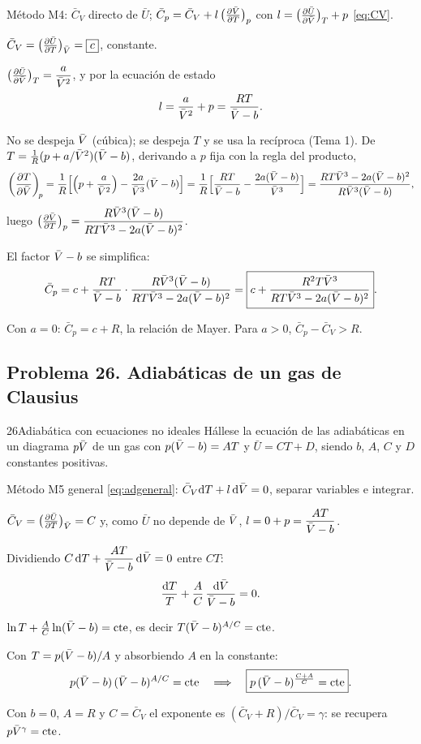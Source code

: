 \begin{resolucion}
\idea Método M4: $\bar C_V$ directo de $\bar U$; $\bar C_p=\bar C_V+l\,\bigl(\tfrac{\partial \bar{V}}{\partial T}\bigr)_{p}$ con
$l=\bigl(\tfrac{\partial \bar U}{\partial \bar{V}}\bigr)_{T}+p$ \eqref{eq:CV}.

 $\bar C_V=\bigl(\tfrac{\partial \bar U}{\partial T}\bigr)_{\bar{V}}=\boxed{c}$, constante.

 $\bigl(\tfrac{\partial \bar U}{\partial \bar{V}}\bigr)_{T}=\dfrac{a}{\bar{V}^2}$, y por la ecuación de estado
\[
  l=\frac{a}{\bar{V}^2}+p=\frac{RT}{\bar{V}-b}.
\]

 No se despeja $\bar{V}$ (cúbica); se despeja $T$ y se usa la recíproca
(Tema 1). De $T=\frac1R(p+a/\bar{V}^2)(\bar{V}-b)$, derivando a $p$ fija con la regla del producto,
\[
  \left(\frac{\partial T}{\partial \bar{V}}\right)_{\!p}=\frac1R\Bigl[\Bigl(p+\frac a{\bar{V}^2}\Bigr)-\frac{2a}{\bar{V}^3}(\bar{V}-b)\Bigr]
   =\frac1R\Bigl[\frac{RT}{\bar{V}-b}-\frac{2a(\bar{V}-b)}{\bar{V}^3}\Bigr]
   =\frac{RT\bar{V}^3-2a(\bar{V}-b)^2}{R\bar{V}^3(\bar{V}-b)},
\]
luego $\bigl(\tfrac{\partial \bar{V}}{\partial T}\bigr)_{p}=\dfrac{R\bar{V}^3(\bar{V}-b)}{RT\bar{V}^3-2a(\bar{V}-b)^2}$.

 El factor $\bar{V}-b$ se simplifica:
\[
  \bar C_p=c+\frac{RT}{\bar{V}-b}\cdot\frac{R\bar{V}^3(\bar{V}-b)}{RT\bar{V}^3-2a(\bar{V}-b)^2}
  =\boxed{c+\frac{R^2T\bar{V}^3}{RT\bar{V}^3-2a(\bar{V}-b)^2}}.
\]

 Con $a=0$: $\bar C_p=c+R$, la relación de Mayer. Para $a>0$, $\bar C_p-\bar C_V>R$.
\end{resolucion}

\subsection{Problema 26. Adiabáticas de un gas de Clausius}
\begin{problema}{26}{Adiabática con ecuaciones no ideales}
Hállese la ecuación de las adiabáticas en un diagrama $p\bar{V}$ de un gas con $p(\bar{V}-b)=AT$ y $\bar U=CT+D$,
siendo $b$, $A$, $C$ y $D$ constantes positivas.
\end{problema}

\begin{resolucion}
\idea Método M5 general \eqref{eq:adgeneral}: $\bar C_V\mathrm{d} T+l\,\mathrm{d}\bar{V}=0$, separar variables e integrar.

 $\bar C_V=\bigl(\tfrac{\partial \bar U}{\partial T}\bigr)_{\bar{V}}=C$ y, como $\bar U$ no depende de $\bar{V}$,
$l=0+p=\dfrac{AT}{\bar{V}-b}$.

 Dividiendo $C\,\mathrm{d} T+\dfrac{AT}{\bar{V}-b}\,\mathrm{d}\bar{V}=0$ entre $CT$:
\[
  \frac{\mathrm{d} T}{T}+\frac AC\,\frac{\mathrm{d}\bar{V}}{\bar{V}-b}=0 .
\]

$\ln T+\frac AC\ln(\bar{V}-b)=\mathrm{cte}$, es decir $T(\bar{V}-b)^{A/C}=\mathrm{cte}$.

 Con $T=p(\bar{V}-b)/A$ y absorbiendo $A$ en la constante:
\[
  p(\bar{V}-b)\,(\bar{V}-b)^{A/C}=\mathrm{cte}\quad\Longrightarrow\quad\boxed{p\,(\bar{V}-b)^{\frac{C+A}{C}}=\mathrm{cte}}.
\]

 Con $b=0$, $A=R$ y $C=\bar C_V$ el exponente es $(\bar C_V+R)/\bar C_V=\gamma$: se recupera
$p\bar{V}^{\gamma}=\mathrm{cte}$.
\end{resolucion}

